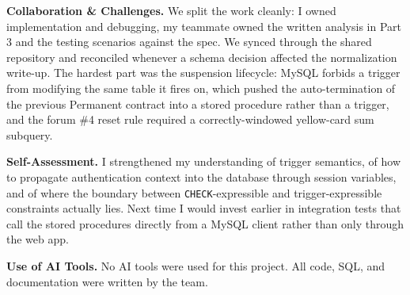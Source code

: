 \documentclass[12pt]{article}
\begin{document}
\textbf{Collaboration \& Challenges.}
We split the work cleanly: I owned implementation and debugging, my
teammate owned the written analysis in Part 3 and the testing
scenarios against the spec. We synced through the shared repository
and reconciled whenever a schema decision affected the normalization
write-up. The hardest part was the suspension lifecycle: MySQL
forbids a trigger from modifying the same table it fires on, which
pushed the auto-termination of the previous Permanent contract into
a stored procedure rather than a trigger, and the forum \#4 reset
rule required a correctly-windowed yellow-card sum subquery.

\textbf{Self-Assessment.}
I strengthened my understanding of trigger semantics, of how to
propagate authentication context into the database through session
variables, and of where the boundary between
\texttt{CHECK}-expressible and trigger-expressible constraints
actually lies. Next time I would invest earlier in integration tests
that call the stored procedures directly from a MySQL client rather
than only through the web app.

\textbf{Use of AI Tools.}
No AI tools were used for this project. All code, SQL, and
documentation were written by the team.
\end{document}
